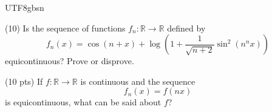 \documentclass[addpoints]{exam}
\theoremstyle{definition}
\begin{document}
\begin{CJK*}{UTF8}{gbsn}
\begin{questions}
\begin{solution} 
 
 \end{solution}
 
 
\question (10)
Is the sequence of functions \(f_n:\mathbb R\to\mathbb R\) defined by
\[
f_n(x)
=
\cos(n+x)
+
\log\left(
1+\frac{1}{\sqrt{n+2}}\sin^2(n^n x)
\right)
\]
equicontinuous? Prove or disprove.





\begin{solution} 
 
 \end{solution}



\question (10 pts)
If \(f:\mathbb R\to\mathbb R\) is continuous and the sequence
\[
f_n(x)=f(nx)
\]
is equicontinuous, what can be said about \(f\)?


   
\begin{solution} 
 
 \end{solution}

\

\end{questions}
\end{CJK*}
\end{document}
